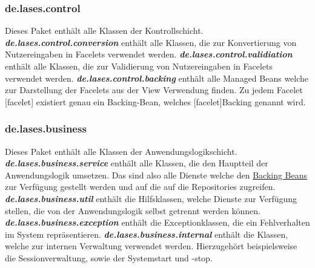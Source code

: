 \subsubsection{de.lases.control} \label{arch:control}
Dieses Paket enthält alle Klassen der Kontrollschicht.
\newline\newline
\textbf{\emph{de.lases.control.conversion}}
enthält alle Klassen, die zur Konvertierung von Nutzereingaben
in Facelets verwendet werden.
\newline\newline
\textbf{\emph{de.lases.control.validiation}}
enthält alle Klassen, die zur Validierung von Nutzereingaben
in Facelets verwendet werden.
\newline\newline
\textbf{\emph{de.lases.control.backing}}\label{arch:backing}
enthält alle Managed Beans welche zur Darstellung der Facelets aus der
View Verwendung finden. Zu jedem Facelet [facelet] existiert genau ein
Backing-Bean, welches [facelet]Backing genannt wird.

\subsubsection{de.lases.business}\label{arch:business}
Dieses Paket enthält alle Klassen der Anwendungslogikschicht.
\newline\newline
\textbf{\emph{de.lases.business.service}}\label{arch:service}
enthält alle Klassen, die den Hauptteil der Anwendungslogik umsetzen.
Das sind also alle Dienste welche den
\hyperref[arch:backing]{Backing Beans} zur Verfügung
gestellt werden und auf die auf die %
Repositories zugreifen.
\newline\newline
\textbf{\emph{de.lases.business.util}}
enthält die Hilfsklassen, welche Dienste zur Verfügung stellen,
die von der Anwendungslogik selbst getrennt werden können.
\newline\newline
\textbf{\emph{de.lases.business.exception}} \label{arch:busex}
enthält die Exceptionklassen, die ein Fehlverhalten im System repräsentieren.
\newline\newline
\textbf{\emph{de.lases.business.internal}}
enthält die Klassen, welche zur internen Verwaltung verwendet werden.
Hierzugehört beispielsweise die Sessionverwaltung, sowie der Systemstart und -stop.

